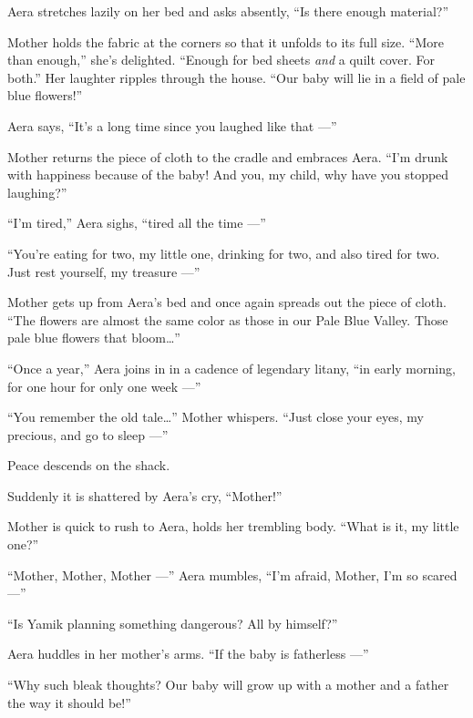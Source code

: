 \documentclass[twoside,11pt,openany]{book}
\begin{document}
Aera stretches lazily on her bed and asks absently, ``Is there enough material?''

Mother holds the fabric at the corners so that it unfolds to its full size. ``More than
enough,'' she's delighted. ``Enough for bed sheets \textit{and} a quilt cover.  For
both.'' Her laughter ripples through the house. ``Our baby will lie in a field of pale blue
flowers!''

Aera says, ``It's a long time since you laughed like that ---''

Mother returns the piece of cloth to the cradle and embraces Aera.  ``I'm drunk with happiness because of
the baby! And you, my child, why have you stopped laughing?''

``I'm tired,'' Aera sighs, ``tired all the time ---''

``You're eating for two, my little one, drinking for two, and also tired for two. Just rest yourself, my
treasure ---''

Mother gets up from Aera's bed and once again spreads out the piece of cloth. ``The flowers are almost the
same color as those in our Pale Blue Valley.
Those pale blue flowers that bloom{\ldots}''

``Once a year,'' Aera joins in in a cadence of legendary litany,
``in early morning, for one hour for only one week ---''

``You remember the old tale{\ldots}'' Mother whispers. ``Just close your eyes, my
precious, and go to sleep ---''

Peace descends on the shack.

Suddenly it is shattered by Aera's cry, ``Mother!''

Mother is quick to rush to Aera, holds her trembling body. ``What is it, my little one?''

``Mother, Mother, Mother ---'' Aera mumbles, ``I'm afraid, Mother, I'm so scared
---''

``Is Yamik planning something dangerous? All by himself?''

Aera huddles in her mother's arms. ``If the baby is fatherless ---''

``Why such bleak thoughts? Our baby will grow up with a mother and a father the way it should
be!''


\bigskip

\chapter{}
\end{document}
